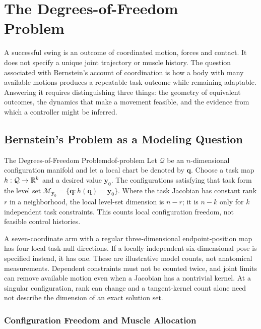 \chapter[The Degrees-of-Freedom Problem]{The Degrees-of-Freedom\\Problem}
\label{ch:dof-problem}

A successful swing is an outcome of coordinated motion, forces and contact.
It does not specify a unique joint trajectory or muscle history.
The question associated with Bernstein's account of coordination
\cite{Bernstein1967} is how a body with many available motions produces a
repeatable task outcome while remaining adaptable.
Answering it requires distinguishing three things: the geometry of equivalent
outcomes, the dynamics that make a movement feasible, and the evidence from
which a controller might be inferred.

\section{Bernstein's Problem as a Modeling Question}

\begin{definition}{The Degrees-of-Freedom Problem}{dof-problem}
Let $\mathcal Q$ be an $n$-dimensional configuration manifold and let a local
chart be denoted by $\bm q$.
Choose a task map $h:\mathcal Q\to\mathbb{R}^k$ and a desired value $\bm y_0$.
The configurations satisfying that task form the level set
$\mathcal M_{\bm y_0}=\{\bm q:h(\bm q)=\bm y_0\}$.
Where the task Jacobian has constant rank $r$ in a neighborhood, the local level-set dimension
is $n-r$; it is $n-k$ only for $k$ independent task constraints.
This counts local configuration freedom, not feasible control histories.
\end{definition}

A seven-coordinate arm with a regular three-dimensional endpoint-position
map has four local task-null directions.
If a locally independent six-dimensional pose is specified instead, it has
one. These are illustrative model counts, not anatomical measurements.
Dependent constraints must not be counted twice, and joint limits can remove
available motion even when a Jacobian has a nontrivial kernel.
At a singular configuration, rank can change and a tangent-kernel count alone
need not describe the dimension of an exact solution set.

\subsection{Configuration Freedom and Muscle Allocation}

